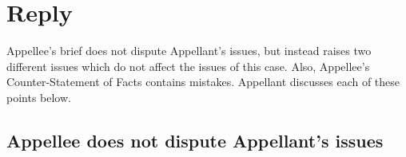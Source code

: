 \documentclass[12pt,\documentclassflag]{michiganCourtOfAppealsBrief}
\begin{document}





\section{Reply}

Appellee's brief does not dispute Appellant's issues, but instead raises two different issues which do not affect the issues of this case.
Also, Appellee's Counter-Statement of Facts contains mistakes.
Appellant discusses each of these points below.

\subsection{Appellee does not dispute Appellant's issues}
\end{document}
